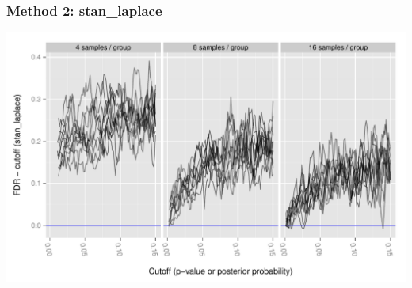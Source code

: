 \documentclass[handout]{beamer}
\numberwithin{equation}{section}
\begin{document}
\begin{frame}
\frametitle{Method 2: stan\_laplace}
\begin{center}
\includegraphics[scale=0.5]{fdr-method2stan}
\end{center}
\end{frame}
\end{document}
